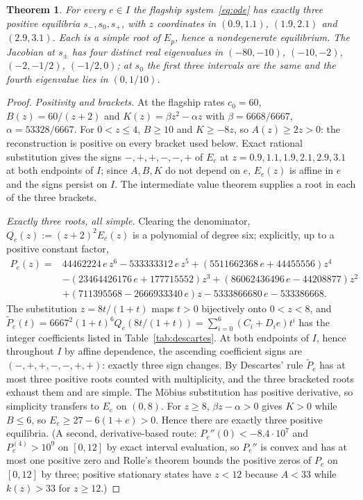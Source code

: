 \documentclass[11pt,a4paper]{article}
\theoremstyle{plain}
\newtheorem{theorem}{Theorem}[section]
\theoremstyle{definition}
\theoremstyle{remark}
\begin{document}
\begin{theorem}\label{thm:count}
For every $e\in I$ the flagship system~\eqref{eq:ode} has exactly three positive equilibria $s_-,s_0,s_+$, with $z$ coordinates in $(0.9,1.1)$, $(1.9,2.1)$ and $(2.9,3.1)$. Each is a simple root of $E_p$, hence a nondegenerate equilibrium. The Jacobian at $s_\pm$ has four distinct real eigenvalues in $(-80,-10)$, $(-10,-2)$, $(-2,-1/2)$, $(-1/2,0)$; at $s_0$ the first three intervals are the same and the fourth eigenvalue lies in $(0,1/10)$.
\end{theorem}
\begin{proof}
\emph{Positivity and brackets.} At the flagship rates $c_0=60$, $B(z)=60/(z+2)$ and $K(z)=\beta z^2-\alpha z$ with $\beta=6668/6667$, $\alpha=53328/6667$. For $0<z\le4$, $B\ge10$ and $K\ge-8z$, so $A(z)\ge2z>0$: the reconstruction is positive on every bracket used below. Exact rational substitution gives the signs $-,+,+,-,-,+$ of $E_e$ at $z=0.9,1.1,1.9,2.1,2.9,3.1$ at both endpoints of $I$; since $A,B,K$ do not depend on $e$, $E_e(z)$ is affine in $e$ and the signs persist on $I$. The intermediate value theorem supplies a root in each of the three brackets.

\emph{Exactly three roots, all simple.} Clearing the denominator, $Q_e(z):=(z+2)^2E_e(z)$ is a polynomial of degree six; explicitly, up to a positive constant factor,
\begin{equation}\label{eq:P}
\begin{aligned}
P_e(z)={}&44462224\,e\,z^6-533333312\,e\,z^5+(5511662368\,e+44455556)z^4\\
&-(23464426176\,e+177715552)z^3+(86062436496\,e-44208877)z^2\\
&+(711395568-2666933340\,e)z-5333866680\,e-533386668 .
\end{aligned}
\end{equation}
The substitution $z=8t/(1+t)$ maps $t>0$ bijectively onto $0<z<8$, and $\widetilde P_e(t)=6667^2(1+t)^6Q_e(8t/(1+t))=\sum_{i=0}^6(C_i+D_ie)t^i$ has the integer coefficients listed in Table~\ref{tab:descartes}. At both endpoints of $I$, hence throughout $I$ by affine dependence, the ascending coefficient signs are $(-,+,+,-,-,+,+)$: exactly three sign changes. By Descartes' rule $\widetilde P_e$ has at most three positive roots counted with multiplicity, and the three bracketed roots exhaust them and are simple. The M\"obius substitution has positive derivative, so simplicity transfers to $E_e$ on $(0,8)$. For $z\ge8$, $\beta z-\alpha>0$ gives $K>0$ while $B\le6$, so $E_e\ge27-6(1+e)>0$. Hence there are exactly three positive equilibria. (A second, derivative-based route: $P_e''(0)<-8.4\cdot10^7$ and $P_e^{(4)}>10^9$ on $[0,12]$ by exact interval evaluation, so $P_e''$ is convex and has at most one positive zero and Rolle's theorem bounds the positive zeros of $P_e$ on $[0,12]$ by three; positive stationary states have $z<12$ because $A<33$ while $k(z)>33$ for $z\ge12$.)


\end{proof}
\end{document}
